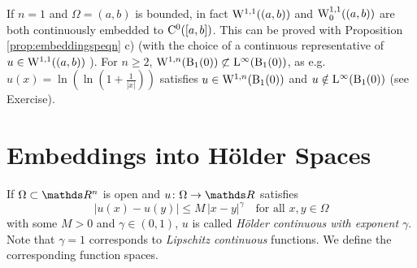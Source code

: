 \begin{rem}
  If $n = 1$ and $\Omega = (a,b)$ is bounded, in fact $\mathrm{W}^{1,1}((a,b))$ and $\mathrm{W}_0^{1,1}((a,b))$ are both continuously embedded to $\mathrm{C}^0([a,b])$.
  This can be proved with Proposition \ref{prop:embeddingspeqn} c) (with the choice of a continuous representative of $u \in \mathrm{W}^{1,1}((a,b))$ ).
  For $n \geq 2$, $\mathrm{W}^{1,n}(\mathrm{B}_1(0)) \not\subset \mathrm{L}^\infty(\mathrm{B}_1(0))$, as e.g. $u(x) = \ln(\ln(1 + \frac{1}{|x|}))$ satisfies $u \in \mathrm{W}^{1,n}(\mathrm{B}_1(0))$ and $u \notin \mathrm{L}^\infty(\mathrm{B}_1(0))$ (see Exercise).
\end{rem}

\section{Embeddings into Hölder Spaces}
\label{sec:hoelderEmbedding}

\setcounter{equation}{11}

If $\Omega \subset \R^n$ is open and $u \colon \Omega \to \R$ satisfies
\begin{equation}
  \label{eq:hoelderCond}
  |u(x) - u(y)| \leq M\, |x - y|^\gamma \quad\text{for all } x, y \in \Omega
\end{equation}
with some $M > 0$ and $\gamma \in (0,1)$, $u$ is called \emph{Hölder continuous with exponent $\gamma$}.
Note that $\gamma = 1$ corresponds to \emph{Lipschitz continuous} functions.
We define the corresponding function spaces.

